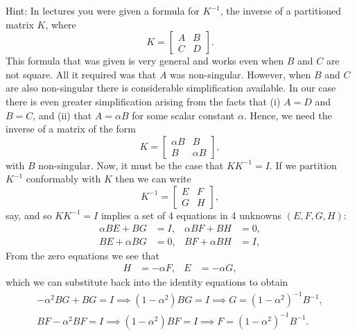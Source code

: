 \begin{enumerate}
         Hint: In lectures you were given a formula for \( K^{-1} \), the inverse of a partitioned 
         matrix \( K \), where 
         \[
            K=
            \begin{bmatrix}
               A & B \\
               C & D
            \end{bmatrix}.
         \]
         This formula that was given is very general and works even when \( B \) and \( C \) are not square.  All
         it required was that \( A \) was non-singular.  However, when \( B \) and \( C \) are also
         non-singular there is considerable simplification available.  In our case there is even
         greater simplification arising from the facts that (i) \( A=D \) and \( B=C \), and (ii)
         that \( A=\alpha B \) for some scalar constant \( \alpha \).  Hence, we need the inverse of
         a matrix of the form
         \[ 
            K=
            \begin{bmatrix}
               \alpha B & B \\
               B & \alpha B
            \end{bmatrix},
         \]
         with \( B \) non-singular.  Now, it must be the case that \( KK^{-1}=I \).  If we partition \(
         K^{-1} \) conformably with \( K \) then we can write
         \[ 
            K^{-1}=
            \begin{bmatrix}
               E & F \\
               G & H
            \end{bmatrix},
         \]
         say, and so \( KK^{-1}=I \) implies a set of 4 equations in 4 unknowns \( (E,F,G,H) \):
         \begin{align*}
            \alpha BE+BG & =I, & \alpha BF+BH & =0, \\
            BE+\alpha BG & =0, & BF+\alpha BH & =I,
         \end{align*}
         From the zero equations we see that 
         \begin{align*}
            H & =-\alpha F, & E & =-\alpha G ,
         \end{align*}
         which we can substitute back into the identity equations to obtain
         \begin{gather*}
            -\alpha^{2}BG+BG=I \implies (1-\alpha^{2})BG=I \implies G=(1-\alpha^{2})^{-1}B^{-1},
            \\
            BF-\alpha^{2}BF=I \implies (1-\alpha^{2})BF=I \implies F=(1-\alpha^{2})^{-1}B^{-1}.

\end{gather*}
\end{enumerate}
